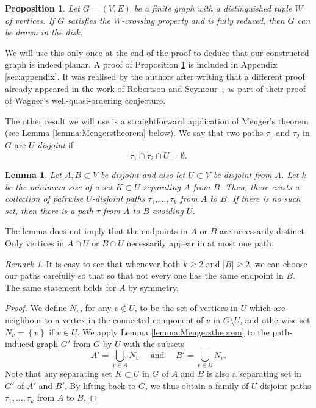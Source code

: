\documentclass{article}
\newtheorem{lemma}[theorem]{Lemma}
\newtheorem{proposition}[theorem]{Proposition}
\numberwithin{equation}{section}
\theoremstyle{definition}
\theoremstyle{definition}
\theoremstyle{remark}
\newtheorem{remark}{Remark}
\renewcommand{\path}{\tau}
\begin{document}
\begin{proposition} \label{prop:main}
    Let $G = (V, E)$ be a finite graph with a distinguished tuple $W$ of vertices. 
    If $G$ satisfies the $W$-crossing property and is fully reduced, then $G$ can be drawn in the disk. 
\end{proposition}
We will use this only once at the end of the proof to deduce that our constructed graph is indeed planar. A proof of Proposition \ref{prop:main} is included in Appendix \ref{sec:appendix}. 
It was realised by the authors after writing that a different proof already appeared in the work of 
Robertson and Seymour~\cite{RobSey},
as part of their proof of Wagner's well-quasi-ordering conjecture. 

The other result we will use is a straightforward application of Menger's theorem \cite{Menger} (see Lemma \ref{lemma:Mengerstheorem} below). 
We say that two paths $\tau_1$ and $\tau_2$ in $G$ are $U$\emph{-disjoint} if 
\[
\tau_1 \cap \tau_2 \cap U = \emptyset.
\] 
\begin{lemma}\label{lemma:newmenger}
	Let $A,B \subset V$ be disjoint and also let $U \subset V$ be disjoint from $A$. Let $k$ be the minimum size of a set $K \subset U$ separating $A$ from $B$.
	Then, there exists a collection of pairwise $U$-disjoint paths $\path_1,\ldots,\path_k$ from $A$ to $B$. 	
	If there is no such set, then there is a path $\tau$ from $A$ to $B$ avoiding $U$. 
\end{lemma}
The lemma does not imply that the endpoints in $A$ or $B$ are necessarily distinct. Only vertices in $A \cap U$ or $B \cap U$ necessarily appear in at most one path. 
\begin{remark}\label{remark:endpoint}
	It is easy to see that whenever both $k \geq 2$ and $|B| \geq 2$, we can choose our paths carefully so that so that not every one has the same endpoint in $B$. The same statement holds for $A$ by symmetry.
\end{remark}
\begin{proof}
	We define $N_v$, for any $v \not\in U$, to be the set of vertices in $U$ which are neighbour to a vertex in the connected component of $v$ in $G \setminus U$, and otherwise set $N_v = \left\{ v \right\}$ if $v \in U$.
	We apply Lemma \ref{lemma:Mengerstheorem} to the path-induced graph $G'$ from $G$ by $U$ with the subsets
	\[
		A' = \bigcup_{v \in A} N_v \quad \text{ and }\quad B' = \bigcup_{v \in B} N_v.
	\]
	Note that any separating set $K \subset U$ in $G$ of $A$ and $B$ is also a separating set in $G'$ of $A'$ and $B'$. 
	By lifting back to $G$, we thus obtain a family of $U$-disjoint paths $\tau_1,\ldots,\tau_k$ from $A$ to $B$.
	\end{proof}
\end{document}
